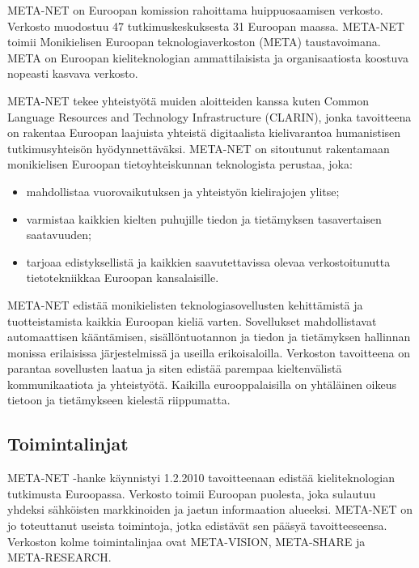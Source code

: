 \documentclass[]{../../metanetpaper}
\begin{document}
\begin{multicols}{2}


META-NET on Euroopan komission rahoittama huippuosaamisen
verkosto. Verkosto muodostuu 47 tutkimuskeskuksesta 31 Euroopan
maassa. META-NET toimii Monikielisen Euroopan teknologiaverkoston
(META) taustavoimana. META on Euroopan kieliteknologian
ammattilaisista ja organisaatiosta koostuva nopeasti kasvava verkosto.






META-NET tekee yhteistyötä muiden aloitteiden kanssa kuten Common
Language Resources and Technology Infrastructure (CLARIN), jonka
tavoitteena on rakentaa Euroopan laajuista yhteistä digitaalista
kielivarantoa humanistisen tutkimusyhteisön hyödynnettäväksi. META-NET
on sitoutunut rakentamaan monikielisen Euroopan tietoyhteiskunnan
teknologista perustaa, joka:
\begin{itemize}
\item mahdollistaa vuorovaikutuksen ja yhteistyön kielirajojen ylitse;

\item varmistaa kaikkien kielten puhujille tiedon ja tietämyksen
    tasavertaisen saatavuuden;

\item tarjoaa edistyksellistä ja kaikkien saavutettavissa olevaa
    verkostoitunutta tietotekniikkaa Euroopan kansalaisille.
\end{itemize}

META-NET edistää monikielisten teknologiasovellusten kehittämistä ja
tuotteistamista kaikkia Euroopan kieliä varten. Sovellukset
mahdollistavat automaattisen kääntämisen, sisällöntuotannon ja tiedon
ja tietämyksen hallinnan monissa erilaisissa järjestelmissä ja useilla
erikoisaloilla. Verkoston tavoitteena on parantaa sovellusten laatua
ja siten edistää parempaa kieltenvälistä kommunikaatiota ja
yhteistyötä. Kaikilla eurooppalaisilla on yhtäläinen oikeus tietoon ja
tietämykseen kielestä riippumatta.


\subsection{Toimintalinjat}


META-NET -hanke käynnistyi 1.2.2010 tavoitteenaan edistää
kieliteknologian tutkimusta Euroopassa. Verkosto toimii Euroopan
puolesta, joka sulautuu yhdeksi sähköisten markkinoiden ja jaetun
informaation alueeksi. META-NET on jo toteuttanut useista toimintoja,
jotka edistävät sen pääsyä tavoitteeseensa.  Verkoston kolme
toimintalinjaa ovat META-VISION, META-SHARE ja \\ META-RESEARCH.




\end{multicols}
\end{document}
